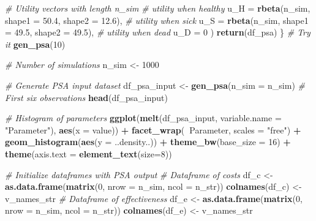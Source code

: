 \documentclass[]{article}
\newenvironment{Shaded}{\begin{snugshade}}{\end{snugshade}}
\newcommand{\KeywordTok}[1]{\textcolor[rgb]{0.13,0.29,0.53}{\textbf{#1}}}
\newcommand{\DataTypeTok}[1]{\textcolor[rgb]{0.13,0.29,0.53}{#1}}
\newcommand{\DecValTok}[1]{\textcolor[rgb]{0.00,0.00,0.81}{#1}}
\newcommand{\FloatTok}[1]{\textcolor[rgb]{0.00,0.00,0.81}{#1}}
\newcommand{\StringTok}[1]{\textcolor[rgb]{0.31,0.60,0.02}{#1}}
\newcommand{\CommentTok}[1]{\textcolor[rgb]{0.56,0.35,0.01}{\textit{#1}}}
\newcommand{\OperatorTok}[1]{\textcolor[rgb]{0.81,0.36,0.00}{\textbf{#1}}}
\newcommand{\NormalTok}[1]{#1}
\begin{document}
\begin{Shaded}
\begin{Highlighting}[]
    \CommentTok{# Utility vectors with length n_sim }
    \CommentTok{# utility when healthy}
    \DataTypeTok{u_H      =} \KeywordTok{rbeta}\NormalTok{(n_sim, }\DataTypeTok{shape1 =}  \FloatTok{50.4}\NormalTok{, }\DataTypeTok{shape2 =} \FloatTok{12.6}\NormalTok{), }
    \CommentTok{# utility when sick}
    \DataTypeTok{u_S      =} \KeywordTok{rbeta}\NormalTok{(n_sim, }\DataTypeTok{shape1 =} \FloatTok{49.5}\NormalTok{, }\DataTypeTok{shape2 =} \FloatTok{49.5}\NormalTok{), }
    \CommentTok{# utility when dead}
    \DataTypeTok{u_D      =} \DecValTok{0}                                              
\NormalTok{  )}
  \KeywordTok{return}\NormalTok{(df_psa)}
\NormalTok{\}}
\CommentTok{# Try it}
\KeywordTok{gen_psa}\NormalTok{(}\DecValTok{10}\NormalTok{) }

\CommentTok{# Number of simulations}
\NormalTok{n_sim <-}\StringTok{ }\DecValTok{1000}

\CommentTok{# Generate PSA input dataset}
\NormalTok{df_psa_input <-}\StringTok{ }\KeywordTok{gen_psa}\NormalTok{(}\DataTypeTok{n_sim =}\NormalTok{ n_sim)}
\CommentTok{# First six observations}
\KeywordTok{head}\NormalTok{(df_psa_input)}

\CommentTok{# Histogram of parameters}
\KeywordTok{ggplot}\NormalTok{(}\KeywordTok{melt}\NormalTok{(df_psa_input, }\DataTypeTok{variable.name =} \StringTok{"Parameter"}\NormalTok{), }\KeywordTok{aes}\NormalTok{(}\DataTypeTok{x =}\NormalTok{ value)) }\OperatorTok{+}
\StringTok{       }\KeywordTok{facet_wrap}\NormalTok{(}\OperatorTok{~}\NormalTok{Parameter, }\DataTypeTok{scales =} \StringTok{"free"}\NormalTok{) }\OperatorTok{+}
\StringTok{       }\KeywordTok{geom_histogram}\NormalTok{(}\KeywordTok{aes}\NormalTok{(}\DataTypeTok{y =}\NormalTok{ ..density..)) }\OperatorTok{+}
\StringTok{       }\KeywordTok{theme_bw}\NormalTok{(}\DataTypeTok{base_size =} \DecValTok{16}\NormalTok{) }\OperatorTok{+}\StringTok{ }
\StringTok{       }\KeywordTok{theme}\NormalTok{(}\DataTypeTok{axis.text =} \KeywordTok{element_text}\NormalTok{(}\DataTypeTok{size=}\DecValTok{8}\NormalTok{))}

\CommentTok{# Initialize dataframes with PSA output }
\CommentTok{# Dataframe of costs}
\NormalTok{df_c <-}\StringTok{ }\KeywordTok{as.data.frame}\NormalTok{(}\KeywordTok{matrix}\NormalTok{(}\DecValTok{0}\NormalTok{, }
                      \DataTypeTok{nrow =}\NormalTok{ n_sim,}
                      \DataTypeTok{ncol =}\NormalTok{ n_str))}
\KeywordTok{colnames}\NormalTok{(df_c) <-}\StringTok{ }\NormalTok{v_names_str}
\CommentTok{# Dataframe of effectiveness}
\NormalTok{df_e <-}\StringTok{ }\KeywordTok{as.data.frame}\NormalTok{(}\KeywordTok{matrix}\NormalTok{(}\DecValTok{0}\NormalTok{, }
                      \DataTypeTok{nrow =}\NormalTok{ n_sim,}
                      \DataTypeTok{ncol =}\NormalTok{ n_str))}
\KeywordTok{colnames}\NormalTok{(df_e) <-}\StringTok{ }\NormalTok{v_names_str}
\end{Highlighting}
\end{Shaded}
\end{document}
